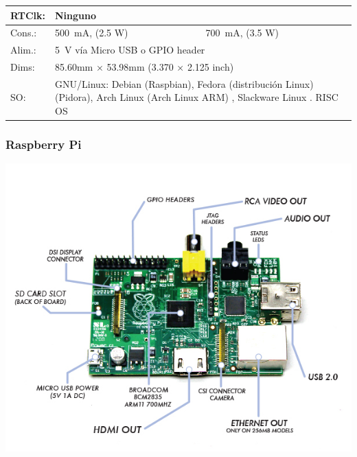 \documentclass[10pt,colorlinks]{beamer}
\begin{document}
\begin{frame}[allowframebreaks]
\begin{longtable}[c]{|p{1.3cm}||p{7cm}|p{2.1cm}|}
RTClk: &\multicolumn{2}{p{9cm}|}{ 
Ninguno}
\\  \hline
 
Cons.: & 500~mA, (2.5 W) & 700~mA, (3.5 W)
\\ \hline
  
Alim.: &\multicolumn{2}{p{9cm}|}{  5~V vía Micro USB o GPIO header}
\\ \hline
  
Dims: &\multicolumn{2}{p{9cm}|}{  85.60mm × 53.98mm (3.370 × 2.125 inch)}
\\ \hline
  
SO: & \multicolumn{2}{p{9cm}|}{ GNU/Linux: Debian
(Raspbian), Fedora (distribución Linux) (Pidora),
Arch Linux (Arch Linux
ARM) , Slackware Linux . RISC OS}
\\  
\hline \hline
\end{longtable}

\end{frame}

\begin{frame}[fragile]\frametitle{Raspberry Pi}

    \centering
    \includegraphics[width=.9\textwidth]{figs/pischeme}

\end{frame}
\end{document}
